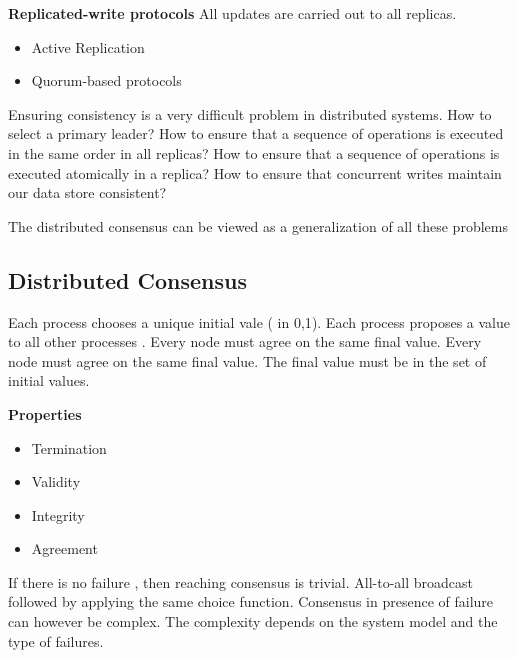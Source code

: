 \documentclass{article}
\begin{document}
\vspace{3mm}
\textbf{Replicated-write protocols}
All updates are carried out to all replicas.

\begin{itemize}
    \item Active Replication 
    \item Quorum-based protocols 
\end{itemize}

Ensuring consistency is a very difficult problem in distributed systems. How to select a primary leader? How to ensure that a sequence of operations is executed in the same order in all replicas? How to ensure that a sequence of operations is executed atomically in a replica? How to ensure that concurrent writes maintain our data store consistent?

The distributed consensus can be viewed as a generalization of all these problems 
\subsection{Distributed Consensus}

Each process chooses a unique initial vale ( in {0,1}). Each process proposes a value to all other processes . Every node must agree on the same final value. Every node must agree on the same final value. The final value must be in the set of initial values.

\vspace{3mm}
\textbf{Properties}

\begin{itemize}
    \item Termination 
    \item Validity 
    \item Integrity 
    \item Agreement 
\end{itemize}

If there is no failure , then reaching consensus is trivial. All-to-all broadcast followed by applying the same choice function. Consensus in presence of failure can however be complex. The complexity depends on the system model and the type of failures.
\end{document}
